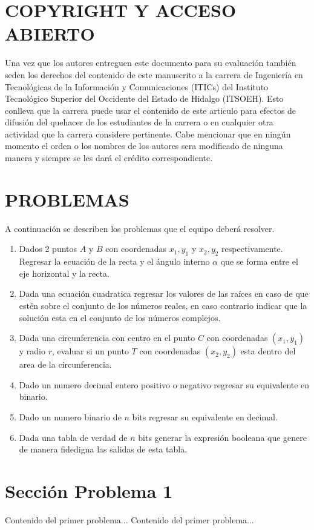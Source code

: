 \documentclass{IEEEcsmag}
\begin{document}
\section{COPYRIGHT Y ACCESO ABIERTO}

Una vez que los autores entreguen este documento para su evaluación también seden los derechos del contenido de este manuscrito a la carrera de Ingeniería en Tecnológicas de la Información y Comunicaciones (ITICs) del Instituto Tecnológico Superior del Occidente del Estado de Hidalgo (ITSOEH). Esto conlleva que la carrera puede usar el contenido de este articulo para efectos de difusión del quehacer de los estudiantes de la carrera o en cualquier otra actividad que la carrera considere pertinente. Cabe mencionar que en ningún momento el orden o los nombres de los autores sera modificado de ninguna manera y siempre se les dará el crédito correspondiente. 
\section{PROBLEMAS}
A continuación se describen los problemas que el equipo deberá resolver.
\begin{enumerate}
\item Dados 2 puntos $A \mbox{ y } B$ con coordenadas $x_{1}, y_{1}$ y $x_{2}, y_{2}$  respectivamente. Regresar la ecuación de la recta y el ángulo interno $\alpha$ que se forma entre el eje horizontal y la recta. 
\item Dada una ecuación cuadratica regresar los valores de las raíces en caso de que estén sobre el conjunto de los números reales, en caso contrario indicar que la solución esta en el conjunto de los números complejos. 
\item Dada una circunferencia con centro en el punto $C$ con coordenadas $(x_{1}, y_{1})$ y radio $r$, evaluar si un punto $T$ con coordenadas $(x_{2}, y_{2})$ esta dentro del area de la circunferencia.
\item Dado un numero decimal entero positivo o negativo regresar su equivalente en binario.
\item Dado un numero binario de $n$ bits regresar su equivalente en decimal.
\item Dada una tabla de verdad de $n$ bits generar la expresión booleana que genere de manera fidedigna las salidas de esta tabla.
\end{enumerate}

\section{Sección Problema 1}
Contenido del primer problema...
\newpage
Contenido del primer problema...
\newpage
\end{document}
